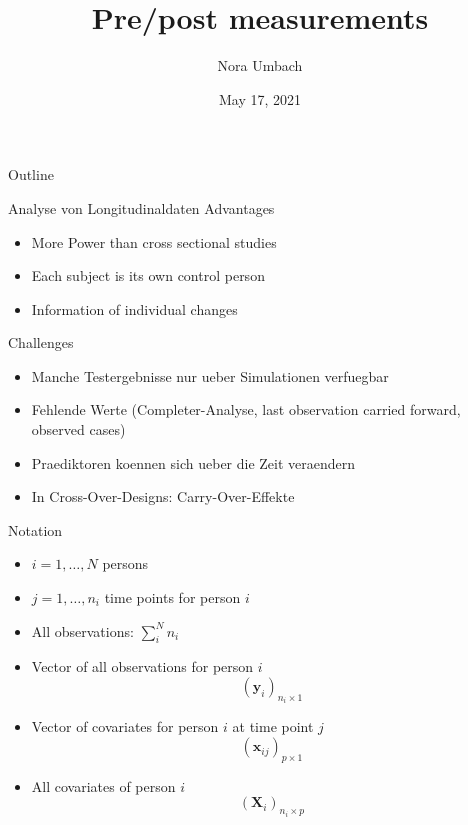 \documentclass{beamer}
\title{Pre/post measurements}
\author{Nora Umbach%
}
\date{May 17, 2021}
\newcommand{\vect}[1]{\mathbf{#1}}
\begin{document}
\begin{frame}{}
\thispagestyle{empty}
\titlepage
\end{frame}

\begin{frame}{Outline}
\tableofcontents
\end{frame}


\begin{frame}{Analyse von Longitudinaldaten}
Advantages

\begin{itemize}
\item More Power than cross sectional studies
\item Each subject is its own control person
\item Information of individual changes
\end{itemize}

Challenges
\begin{itemize}
\item Manche Testergebnisse nur ueber Simulationen verfuegbar
\item Fehlende Werte (Completer-Analyse, last observation carried forward,
  observed cases)
\item Praediktoren koennen sich ueber die Zeit veraendern
\item In Cross-Over-Designs: Carry-Over-Effekte
\end{itemize}
\end{frame}


\begin{frame}{Notation}
\begin{itemize}
\item $i = 1, \dots, N$ persons\\[2ex]

\item $j = 1, \dots, n_i$ time points for person $i$\\[2ex]

\item All observations: $\displaystyle\sum_i^N n_i$\\[2ex]

\item Vector of all observations for person $i$
\[
  (\vect{y}_i)_{n_i \times 1}
\]
%
\item Vector of covariates for person $i$ at time point $j$
\[
  (\vect{x}_{ij})_{p \times 1}
\]
%
\item All covariates of person $i$
\[
  (\vect{X}_i)_{n_i \times p}
\]
\end{itemize}
\end{frame}
\end{document}
